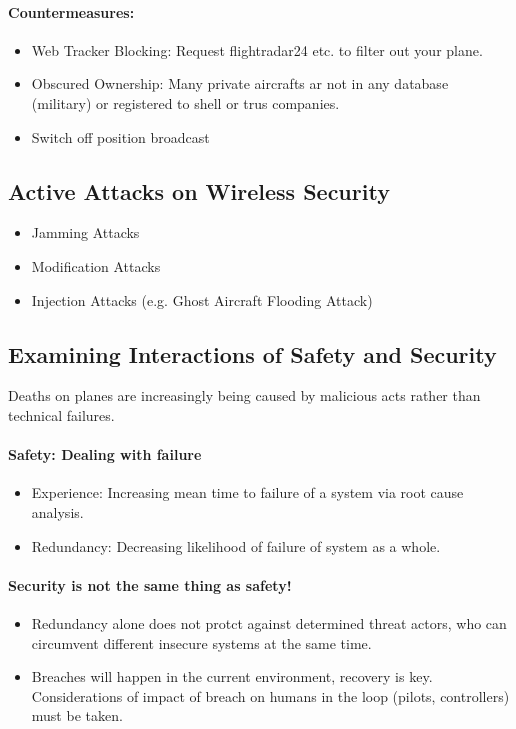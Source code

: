 \paragraph{Countermeasures:}
\begin{itemize}
    \item Web Tracker Blocking: Request flightradar24 etc. to filter out your plane.
    \item Obscured Ownership: Many private aircrafts ar not in any database (military) or registered to shell or trus companies.
    \item Switch off position broadcast
\end{itemize}

\subsection{Active Attacks on Wireless Security}
\begin{itemize}
    \item Jamming Attacks
    \item Modification Attacks
    \item Injection Attacks (e.g. Ghost Aircraft Flooding Attack)
\end{itemize}

\subsection{Examining Interactions of Safety and Security}
Deaths on planes are increasingly being caused by malicious acts rather than technical failures.

\paragraph{Safety: Dealing with failure}
\begin{itemize}
    \item Experience: Increasing mean time to failure of a system via root cause analysis.
    \item Redundancy: Decreasing likelihood of failure of system as a whole.
\end{itemize}

\paragraph{Security is not the same thing as safety!}
\begin{itemize}
    \item Redundancy alone does not protct against determined threat actors, who can circumvent different insecure systems at the same time.
    \item Breaches will happen in the current environment, recovery is key. Considerations of impact of breach on humans in the loop (pilots, controllers) must be taken.
\end{itemize}

